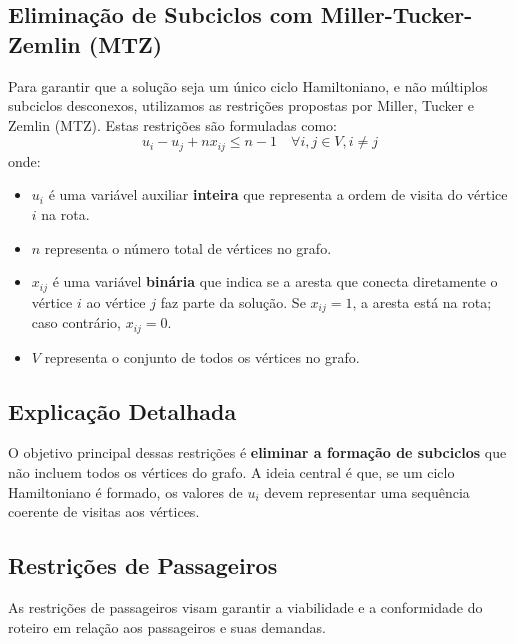 \documentclass[12pt, a4paper]{report}
\begin{document}
\subsection*{Eliminação de Subciclos com Miller-Tucker-Zemlin (MTZ)}
Para garantir que a solução seja um único ciclo Hamiltoniano, e não múltiplos subciclos desconexos, utilizamos as restrições propostas por Miller, Tucker e Zemlin (MTZ). Estas restrições são formuladas como:
\begin{equation}
    u_i - u_j + n x_{ij} \leq n-1 \quad \forall i,j \in V, i \neq j
\end{equation}
onde:
\begin{itemize}
    \item $u_i$ é uma variável auxiliar \textbf{inteira} que representa a ordem de visita do vértice $i$ na rota.
    \item $n$ representa o número total de vértices no grafo.
     \item $x_{ij}$ é uma variável \textbf{binária} que indica se a aresta que conecta diretamente o vértice $i$ ao vértice $j$ faz parte da solução. Se $x_{ij} = 1$, a aresta está na rota; caso contrário, $x_{ij} = 0$.
    \item $V$ representa o conjunto de todos os vértices no grafo.
\end{itemize}

\subsection*{Explicação Detalhada}
\noindent O objetivo principal dessas restrições é \textbf{eliminar a formação de subciclos} que não incluem todos os vértices do grafo. A ideia central é que, se um ciclo Hamiltoniano é formado, os valores de $u_i$ devem representar uma sequência coerente de visitas aos vértices.


\subsection{Restrições de Passageiros}
As restrições de passageiros visam garantir a viabilidade e a conformidade do roteiro em relação aos passageiros e suas demandas.
\end{document}
